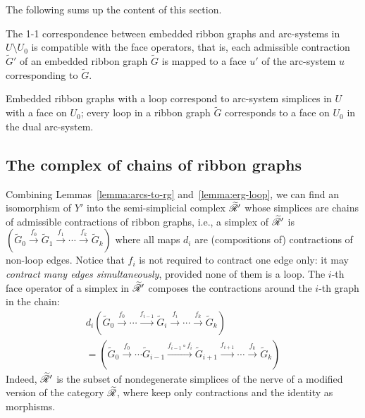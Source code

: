 The following sums up the content of this section.
\begin{lemma}
  \label{lemma:erg-loop}
  The 1-1 correspondence between embedded ribbon graphs and
  arc-systems in $U \setminus U_0$ is compatible with the face operators, that
  is, each admissible contraction $\tilde G'$ of an embedded ribbon
  graph $\tilde G$ is mapped to a face $u'$ of the arc-system $u$
  corresponding to $\tilde G$.

  Embedded ribbon graphs with a loop correspond to arc-system simplices
  in $U$ with a face on $U_0$; every loop in a ribbon graph $\tilde G$
  corresponds to a face on $U_0$ in the dual arc-system.
\end{lemma}


\subsection{The complex of chains of ribbon graphs}
\label{sec:chains}

Combining Lemmas~\ref{lemma:arcs-to-rg} and~\ref{lemma:erg-loop}, we
can find an isomorphism of $Y'$ into the semi-simplicial complex
$\mathscr{\widetilde R}_{}'$ whose simplices are chains of admissible contractions of
ribbon graphs, i.e., a simplex of $\mathscr{\widetilde R}_{}'$ is $({\tilde G}_0
\overset{f_0}\to {\tilde G}_1 \overset{f_1}\to \cdots \overset{f_k}\to {\tilde
  G}_k)$ where all maps $d_i$ are (compositions of) contractions of
non-loop edges.  Notice that $f_i$ is not required to contract one
edge only: it may \emph{contract many edges simultaneously}, provided
none of them is a loop.  The $i$-th face operator of a simplex in
$\mathscr{\widetilde R}_{}'$ composes the contractions around the $i$-th graph in the
chain:
\begin{multline*}
  d_i({\tilde G}_0 \overset{f_0}\to \cdots \xrightarrow{f_{i-1}} {\tilde
    G}_i \overset{f_i}\to \cdots \overset{f_k}\to {\tilde G}_k) \\
  = ({\tilde G}_0 \overset{f_0}\to \cdots {\tilde
    G}_{i-1} \xrightarrow{f_{i-1} \circ f_i} {\tilde G_{i+1}} 
    \xrightarrow{f_{i+1}} \cdots \overset{f_k}\to {\tilde G}_k)
\end{multline*}
Indeed, $\mathscr{\widetilde R}_{}'$ is the subset of nondegenerate simplices of the nerve
of a modified version of the category $\mathscr{\widetilde R}_{}$, where keep only
contractions and the identity as morphisms.%

